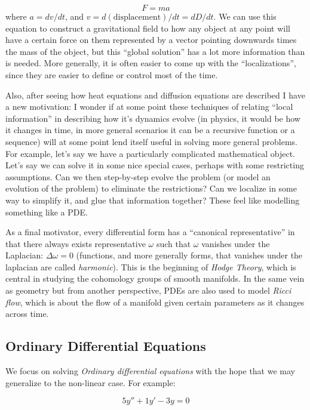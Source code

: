 \documentclass{book}
\begin{document}
\[
	F = ma
\]
where $a = dv/dt$, and $v = d(\textrm{displacement})/dt = dD/dt$. We can use this equation to construct a gravitational
field to how any object at any point will have a certain force on them represented by a vector pointing downwards times
the mass of the object, but this ``global solution'' has a lot more information than is needed. More generally, it is
often easier to come up with the ``localizations'', since they are easier to define or control most of the time.

Also, after seeing how heat equations and diffusion equations are described I have a new motivation:
I wonder if at some point these techniques of relating ``local information'' in describing how it's dynamics evolve (in
physics, it would be how it changes in time, in more general scenarios it can be a recursive function or a sequence)
will at some point lend itself useful in solving more general problems. For example, let's say we have a particularly complicated
mathematical object. Let's say we can solve it in some nice special cases, perhaps with some restricting assumptions.
Can we then step-by-step evolve the problem (or model an evolution of the problem) to eliminate the restrictions? Can we
localize in some way to simplify it, and glue that information together? These feel like modelling something like a PDE.

As a final motivator, every differential form has a ``canonical representative'' in that there always exists
representative $\omega$ such that $\omega$ vanishes under the Laplacian: $\Delta \omega = 0$ (functions, and more
generally forms, that vanishes under the laplacian are called \emph{harmonic}). This is the beginning of \emph{Hodge
Theory}, which is central in studying the cohomology groups of smooth manifolds. In the same vein as geometry but from
another perspective, PDEs are also used to model  \emph{Ricci flow}, which is about the flow of a manifold given certain
parameters as it changes across time.

\subsection*{Ordinary Differential Equations}



We focus on solving \emph{Ordinary differential equations} with the hope that we may generalize to the non-linear case. For example:

\[
	5y'' + 1y' -3y =0
\]
\end{document}
